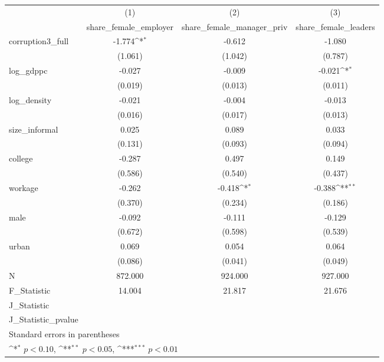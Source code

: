 {
\def\sym#1{\ifmmode^{#1}\else\(^{#1}\)\fi}
\begin{tabular}{l*{3}{c}}
\hline\hline
            &\multicolumn{1}{c}{(1)}&\multicolumn{1}{c}{(2)}&\multicolumn{1}{c}{(3)}\\
            &\multicolumn{1}{c}{share\_female\_employer}&\multicolumn{1}{c}{share\_female\_manager\_priv}&\multicolumn{1}{c}{share\_female\_leaders}\\
\hline
corruption3\_full&      -1.774\sym{*}  &      -0.612         &      -1.080         \\
            &     (1.061)         &     (1.042)         &     (0.787)         \\
[1em]
log\_gdppc   &      -0.027         &      -0.009         &      -0.021\sym{*}  \\
            &     (0.019)         &     (0.013)         &     (0.011)         \\
[1em]
log\_density &      -0.021         &      -0.004         &      -0.013         \\
            &     (0.016)         &     (0.017)         &     (0.013)         \\
[1em]
size\_informal&       0.025         &       0.089         &       0.033         \\
            &     (0.131)         &     (0.093)         &     (0.094)         \\
[1em]
college     &      -0.287         &       0.497         &       0.149         \\
            &     (0.586)         &     (0.540)         &     (0.437)         \\
[1em]
workage     &      -0.262         &      -0.418\sym{*}  &      -0.388\sym{**} \\
            &     (0.370)         &     (0.234)         &     (0.186)         \\
[1em]
male        &      -0.092         &      -0.111         &      -0.129         \\
            &     (0.672)         &     (0.598)         &     (0.539)         \\
[1em]
urban       &       0.069         &       0.054         &       0.064         \\
            &     (0.086)         &     (0.041)         &     (0.049)         \\
\hline
N           &     872.000         &     924.000         &     927.000         \\
F\_Statistic &      14.004         &      21.817         &      21.676         \\
J\_Statistic &                     &                     &                     \\
J\_Statistic\_pvalue&                     &                     &                     \\
\hline\hline
\multicolumn{4}{l}{\footnotesize Standard errors in parentheses}\\
\multicolumn{4}{l}{\footnotesize \sym{*} \(p<0.10\), \sym{**} \(p<0.05\), \sym{***} \(p<0.01\)}\\
\end{tabular}
}
